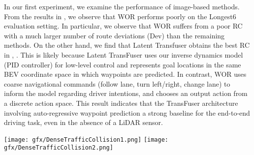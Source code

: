  In our first experiment, we examine the performance of image-based methods. From the results in , we observe that WOR performs poorly on the Longest6 evaluation setting. In particular, we observe that WOR suffers from a poor RC with a much larger number of route deviations (Dev) than the remaining methods. On the other hand, we find that Latent Transfuser obtains the best RC in , . This is likely because Latent TransFuser uses our inverse dynamics model (PID controller) for low-level control and represents goal locations in the same BEV coordinate space in which waypoints are predicted. In contrast, WOR uses coarse navigational commands (\eg follow lane, turn left/right, change lane) to inform the model regarding driver intentions, and chooses an output action from a discrete action space. This result indicates that the TransFuser architecture involving auto-regressive waypoint prediction a strong baseline for the end-to-end driving task, even in the absence of a LiDAR sensor. 

\begin{figure*}[t]
    \centering
    \texttt{[image: gfx/DenseTrafficCollision1.png]}
    \texttt{[image: gfx/DenseTrafficCollision2.png]}
    \caption{}
    \vspace{-0.0cm}
    \label{fig:lane_change_collision}
    \vspace{-0.0cm}
\end{figure*}

